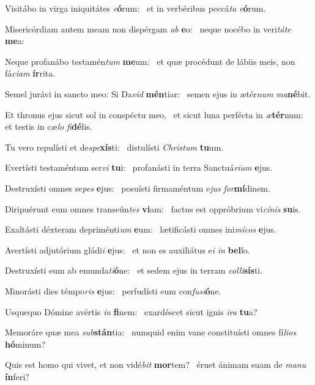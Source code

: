 \item Visitábo in virga iniquitátes \textit{e}\textbf{ó}rum:~\psstar{} et in verbéribus peccá\textit{ta} \textit{e}\textbf{ó}rum.
\item Misericórdiam autem meam non dispérgam \textit{ab} \textbf{e}o:~\psstar{} neque nocébo in veri\textit{táte} \textbf{me}a:
\item Neque profanábo testamén\textit{tum} \textbf{me}um:~\psstar{} et quæ procédunt de lábiis meis, non fá\textit{ciam} \textbf{ír}rita.
\item Semel jurávi in sancto meo: Si Da\textit{vid} \textbf{mén}tiar:~\psstar{} semen ejus in ætér\textit{num} \textit{ma}\textbf{né}bit.
\item Et thronus ejus sicut sol in conspéctu meo,~\pscross{} et sicut luna perfécta in \textit{æ}\textbf{tér}num:~\psstar{} et testis in cæ\textit{lo} \textit{fi}\textbf{dé}lis.
\item Tu vero repulísti et de\textit{spe}\textbf{xís}ti:~\psstar{} distulísti \textit{Christum} \textbf{tu}um.
\item Evertísti testaméntum ser\textit{vi} \textbf{tu}i:~\psstar{} profanásti in terra Sanctuá\textit{rium} \textbf{e}jus.
\item Destruxísti omnes se\textit{pes} \textbf{e}jus:~\psstar{} posuísti firmaméntum e\textit{jus} \textit{for}\textbf{mí}dinem.
\item Diripuérunt eum omnes transeún\textit{tes} \textbf{vi}am:~\psstar{} factus est oppróbrium vi\textit{cínis} \textbf{su}is.
\item Exaltásti déxteram depriménti\textit{um} \textbf{e}um:~\psstar{} lætificásti omnes ini\textit{mícos} \textbf{e}jus.
\item Avertísti adjutórium gládi\textit{i} \textbf{e}jus:~\psstar{} et non es auxiliátus e\textit{i} \textit{in} \textbf{bel}lo.
\item Destruxísti eum ab emunda\textit{ti}\-\textbf{ó}ne:~\psstar{} et sedem ejus in terram \textit{colli}\textbf{sís}ti.
\item Minorásti dies témpo\textit{ris} \textbf{e}jus:~\psstar{} perfudísti eum con\textit{fusi}\textbf{ó}ne.
\item Usquequo Dómine avértis \textit{in} \textbf{fi}nem:~\psstar{} exardéscet sicut ignis \textit{ira} \textbf{tu}a?
\item Memoráre quæ mea \textit{sub}\textbf{stán}\-tia:~\psstar{} numquid enim vane constituísti omnes fí\textit{lios} \textbf{hó}minum?
\item Quis est homo qui vivet, et non vidé\textit{bit} \textbf{mor}tem?~\psstar{} éruet ánimam suam de \textit{manu} \textbf{ín}feri?
